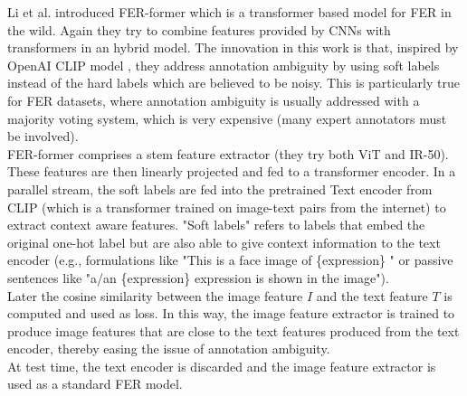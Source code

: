 Li et al. introduced FER-former \cite{RW_2_FER-former} which is a transformer based model for FER in the wild. Again they try to combine features provided by CNNs with transformers in an hybrid model. The innovation in this work is that, inspired by OpenAI CLIP model \cite{RW_4B_CLIP}, they address annotation ambiguity by using soft labels instead of the hard labels which are believed to be noisy. This is particularly true for FER datasets, where annotation ambiguity is usually addressed with a majority voting system, which is very expensive (many expert annotators must be involved).\\
FER-former comprises a stem feature extractor (they try both ViT and IR-50). These features are then linearly projected and fed to a transformer encoder. In a parallel stream, the soft labels are fed into the pretrained Text encoder from CLIP (which is a transformer trained on image-text pairs from the internet) to extract context aware features. "Soft labels" refers to labels that embed the original one-hot label but are also able to give context information to the text encoder (e.g., formulations like "This is a face image of \{expression\} " or passive sentences like "a/an \{expression\} expression is shown in the image").\\
Later the cosine similarity between the image feature $I$ and the text feature $T$ is computed and used as loss. In this way, the image feature extractor is trained to produce image features that are close to the text features produced from the text encoder, thereby easing the issue of annotation ambiguity.\\
At test time, the text encoder is discarded and the image feature extractor is used as a standard FER model.\\


